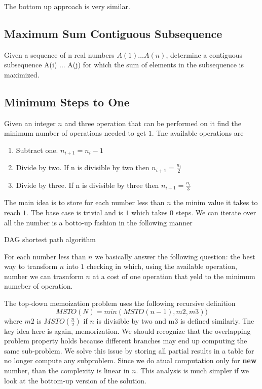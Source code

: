 The bottom up approach is very similar. 


\subsection{Maximum Sum Contiguous Subsequence}
Given a sequence of n real numbers $A(1) \ldots A(n)$, determine a contiguous subsequence A(i) ... A(j) for which the sum of elements in the subsequence is maximized.



\subsection{Minimum Steps to One}
Given an integer $n$ and three operation that can be performed on it find the minimum number of operations needed to get $1$. Tne available operations are
\begin{enumerate}
\item Subtract one. $n_{i+1}=n_{i}-1$
\item Divide by two. If n is divisible by two then $n_{i+1}=\frac{n_{i}}{2}$
\item Divide by three. If n is divisible by three then $n_{i+1}=\frac{n_{i}}{3}$
\end{enumerate}

	The main idea is to store for each number less than $n$ the minim value it takes to reach $1$. Tbe base case is trivial and is $1$ which takes $0$ steps.
	We can iterate over all the number is a botto-up fashion in the following manner
	
	\begin{algorithm}\label{alg:dagshortest}
\caption{DAG shortest path algorithm}
\end{algorithm}
For each number less than $n$ we basically answer the following question: the best way to transform $n$ into $1$ checking in which, using the available operation, number we can trasnform $n$ at a cost of one operation that yeld to the minimum numeber of operation. 

The top-down memoization problem uses the following recursive definition
\[
	MSTO(N) = min(MSTO(n-1),m2,m3))
\]
where $m2$ is $MSTO(\frac{n}{2})$ if $n$ is divisible by two and m3 is defined similarly. Tne key idea here is again, memorization. We should recognize that the overlapping problem property holds because different branches may end up computing the same sub-problem. We solve this issue by storing all partial results in a table for no longer compute any subproblem.
Since we do atual computation only for \textbf{new} number, than the complexity is linear in $n$.  This analysis is much simpler if we look at the bottom-up version of the solution.

